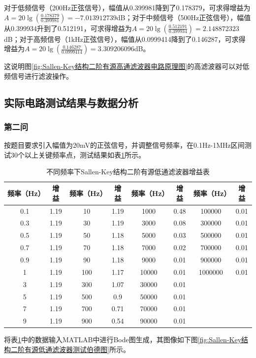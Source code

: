 \documentclass[./测控三级项目.tex]{subfiles} %
\begin{document}
				对于低频信号（200Hz正弦信号），幅值从0.399981降到了0.178379，可求得增益为$A=20\lg(\frac{0.178379}{0.399981})=-7.013912739$dB；对于中频信号（500Hz正弦信号），幅值从0.399934升到了0.512191，可求得增益为$A=20\lg(\frac{0.512191}{0.399934})=2.148872323$dB；对于高频信号（1kHz正弦信号），幅值从0.0999414降到了0.146287，可求得增益为$A=20\lg(\frac{0.146287}{0.0999414})=3.309206096$dB。\par
				这说明图\ref{fig:Sallen-Key结构二阶有源高通滤波器电路原理图}的高滤波器可以对低频信号进行滤波操作。
	\subsection{实际电路测试结果与数据分析}
		\subsubsection{第二问}
			按题目要求引入幅值为20mV的正弦信号，并调整信号频率，在0.1Hz-1MHz区间测试30个以上关键频率点，测试结果如表\ref{tab:不同频率下Sallen-Key结构二阶有源低通滤波器增益表}所示。
			\begin{table}[h!]
				\centering
				\caption{不同频率下Sallen-Key结构二阶有源低通滤波器增益表}
				\label{tab:不同频率下Sallen-Key结构二阶有源低通滤波器增益表}
				\begin{tabular}{|c|c|c|c|c|c|c|c|}
					\hline
					频率（Hz） & 增益  & 频率（Hz） & 增益 & 频率（Hz） & 增益 & 频率（Hz） & 增益\\
					\hline
					0.1&1.19&10&1.19&1000&0.48&100000&0.01\\\hline
					0.3&1.19&30&1.19&3000&0.08&300000&0.01\\\hline
					0.5&1.19&50&1.18&5000&0.03&500000&0.01\\\hline
					0.7&1.19&70&1.18&7000&0.02&700000&0.01\\\hline
					0.9&1.19&90&1.18&9000&0.01&900000&0.01\\\hline
					1&1.19&100&1.17&10000&0.01&1000000&0.01\\\hline
					3&1.19&300&1.07&30000&0.01&&\\\hline
					5&1.19&500&0.9&50000&0.01&&\\\hline
					7&1.19&700&0.71&70000&0.01&&\\\hline
					9&1.19&900&0.54&90000&0.01&&\\\hline
				\end{tabular}
			\end{table}	\par
			将表\ref{tab:不同频率下Sallen-Key结构二阶有源低通滤波器增益表}中的数据输入MATLAB中进行Bode图生成，其图像如下图\ref{fig:Sallen-Key结构二阶有源低通滤波器测试伯德图}所示。
\end{document}
